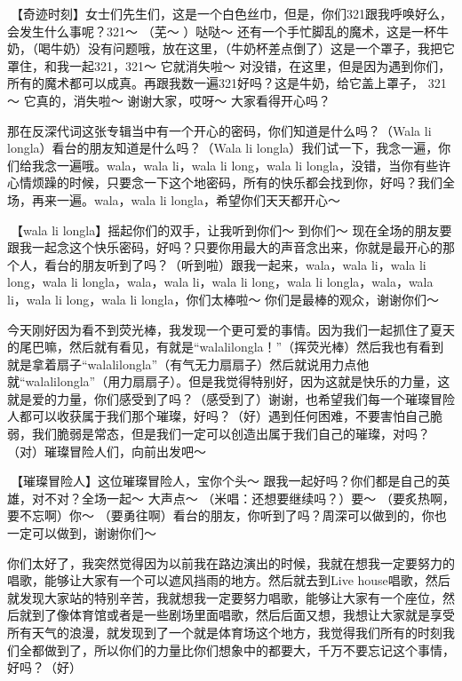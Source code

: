 \documentclass[
]{book}
\begin{document}
🎵【奇迹时刻】女士们先生们，这是一个白色丝巾，但是，你们321跟我呼唤好么，会发生什么事呢？321～ （芜～ ）哒哒～ 还有一个手忙脚乱的魔术，这是一杯牛奶，（喝牛奶）没有问题哦，放在这里，（牛奶杯差点倒了）这是一个罩子，我把它罩住，和我一起321，321～ 它就消失啦～ 对没错，在这里，但是因为遇到你们，所有的魔术都可以成真。再跟我数一遍321好吗？这是牛奶，给它盖上罩子， 321 ～ 它真的，消失啦～ 谢谢大家，哎呀～ 大家看得开心吗？

那在反深代词这张专辑当中有一个开心的密码，你们知道是什么吗？（Wala li longla）看台的朋友知道是什么吗？（Wala li longla）我们试一下，我念一遍，你们给我念一遍哦。wala，wala li，wala li long，wala li longla，没错，当你有些许心情烦躁的时候，只要念一下这个地密码，所有的快乐都会找到你，好吗？我们全场，再来一遍。wala，wala li longla，希望你们天天都开心～

🎵【wala li longla】摇起你们的双手，让我听到你们～ 到你们～ 现在全场的朋友要跟我一起念这个快乐密码，好吗？只要你用最大的声音念出来，你就是最开心的那个人，看台的朋友听到了吗？（听到啦）跟我一起来，wala，wala li，wala li long，wala li longla，wala，wala li，wala li long，wala li longla，wala，wala li，wala li long，wala li longla，你们太棒啦～ 你们是最棒的观众，谢谢你们～

今天刚好因为看不到荧光棒，我发现一个更可爱的事情。因为我们一起抓住了夏天的尾巴嘛，然后就有看见，有就是``walalilongla！''（挥荧光棒）然后我也有看到就是拿着扇子``walalilongla''（有气无力扇扇子）然后就说用力点他就``walalilongla''（用力扇扇子）。但是我觉得特别好，因为这就是快乐的力量，这就是爱的力量，你们感受到了吗？（感受到了）谢谢，也希望我们每一个璀璨冒险人都可以收获属于我们那个璀璨，好吗？（好）遇到任何困难，不要害怕自己脆弱，我们脆弱是常态，但是我们一定可以创造出属于我们自己的璀璨，对吗？（对）璀璨冒险人们，向前出发吧～

🎵【璀璨冒险人】这位璀璨冒险人，宝你个头～ 跟我一起好吗？你们都是自己的英雄，对不对？全场一起～ 大声点～ （米唱：还想要继续吗？）要～ （要炙热啊，要不忘啊）你～ （要勇往啊）看台的朋友，你听到了吗？周深可以做到的，你也一定可以做到，谢谢你们～

你们太好了，我突然觉得因为以前我在路边演出的时候，我就在想我一定要努力的唱歌，能够让大家有一个可以遮风挡雨的地方。然后就去到Live house唱歌，然后就发现大家站的特别辛苦，我就想我一定要努力唱歌，能够让大家有一个座位，然后就到了像体育馆或者是一些剧场里面唱歌，然后后面又想，我想让大家就是享受所有天气的浪漫，就发现到了一个就是体育场这个地方，我觉得我们所有的时刻我们全都做到了，所以你们的力量比你们想象中的都要大，千万不要忘记这个事情，好吗？（好）
\end{document}
